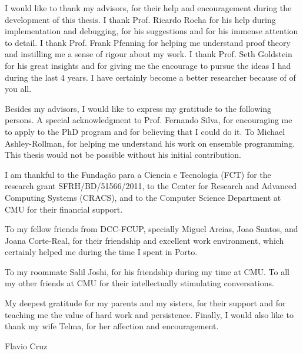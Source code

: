 I would like to thank my advisors, for their help and encouragement during the
development of this thesis. I thank Prof. Ricardo Rocha for his help during
implementation and debugging, for his suggestions and for his immense attention
to detail. I thank Prof. Frank Pfenning for helping me understand proof theory
and instilling me a sense of rigour about my work. I thank Prof. Seth Goldstein
for his great insights and for giving me the encourage to pursue the ideas I
had during the last 4 years. I have certainly become a better researcher
because of of you all.

Besides my advisors, I would like to express my gratitude to the following
persons. A special acknowledgment to Prof. Fernando Silva, for encouraging me
to apply to the PhD program and for believing that I could do it.  To Michael
Ashley-Rollman, for helping me understand his work on ensemble programming.
This thesis would not be possible without his initial contribution.

I am thankful to the Fundação para a Ciencia e Tecnologia (FCT) for the
research grant SFRH/BD/51566/2011, to the Center for Research and Advanced
Computing Systems (CRACS), and to the Computer Science Department at CMU for
their financial support.

To my fellow friends from DCC-FCUP, specially Miguel Areias, Joao Santos, and
Joana Corte-Real, for their friendship and excellent work environment, which
certainly helped me during the time I spent in Porto.

To my roommate Salil Joshi, for his friendship during my time at CMU. To all my
other friends at CMU for their intellectually stimulating conversations.

My deepest gratitude for my parents and my sisters, for their support and for
teaching me the value of hard work and persistence. Finally, I would also like
to thank my wife Telma, for her affection and encouragement.

\begin{flushright}
Flavio Cruz \\
\end{flushright}
